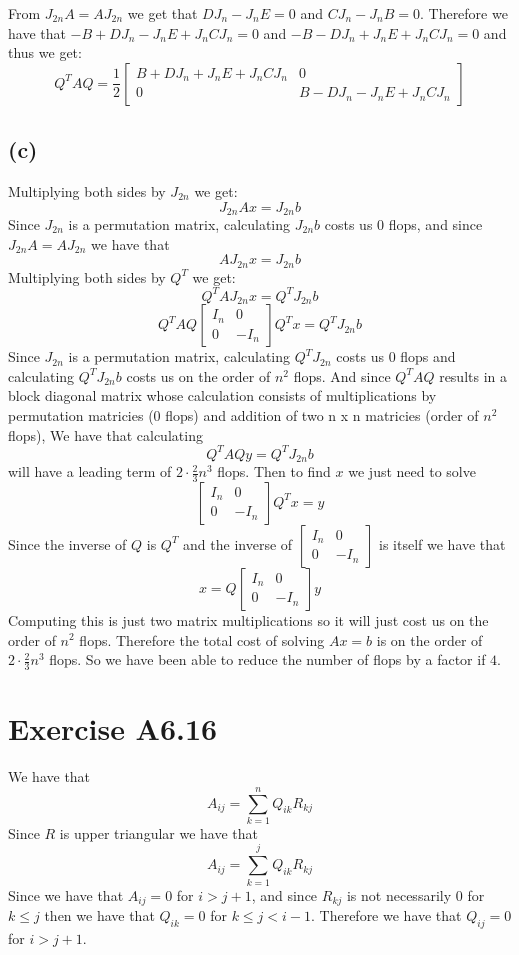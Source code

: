 From $J_{2n}A=AJ_{2n}$ we get that $DJ_n-J_nE=0$ and 
$CJ_n-J_nB=0$. Therefore we have that $-B+DJ_n-J_nE+J_nCJ_n=0$
and $-B-DJ_n+J_nE+J_nCJ_n=0$ and thus we get:
$$Q^TAQ=\frac{1}{2} \begin{bmatrix}
        B+DJ_n+J_nE+J_nCJ_n & 0\\
        0 & B-DJ_n-J_nE+J_nCJ_n
    \end{bmatrix}$$
\subsection*{(c)}
Multiplying both sides by $J_{2n}$ we get:
$$J_{2n}Ax=J_{2n}b$$
Since $J_{2n}$ is a permutation matrix, calculating $J_{2n}b$ costs us 
0 flops, and since $J_{2n}A=AJ_{2n}$ we have that 
$$AJ_{2n}x=J_{2n}b$$
Multiplying both sides by $Q^T$ we get:
$$Q^TAJ_{2n}x=Q^TJ_{2n}b$$
$$Q^TAQ\begin{bmatrix}
        I_n & 0\\
        0 & -I_n
    \end{bmatrix}Q^Tx=Q^TJ_{2n}b$$
Since $J_{2n}$ is a permutation matrix, calculating $Q^TJ_{2n}$ costs us 
0 flops and calculating $Q^TJ_{2n}b$ costs us on the order of $n^2$ flops.
And since $Q^TAQ$ results in a block diagonal matrix whose
calculation consists of multiplications by permutation matricies (0 flops)
and addition of two n x n matricies (order of $n^2$ flops),
We have that calculating 
$$Q^TAQy=Q^TJ_{2n}b$$
will have a leading term of $2\cdot\frac{2}{3}n^3$ flops. Then to find 
$x$ we just need to solve
$$\begin{bmatrix}
    I_n & 0\\
    0 & -I_n
\end{bmatrix}Q^Tx=y$$
Since the inverse of $Q$ is $Q^T$ and the inverse of $\begin{bmatrix}
    I_n & 0\\
    0 & -I_n
\end{bmatrix}$ is itself we have that
$$x=Q\begin{bmatrix}
    I_n & 0\\
    0 & -I_n
\end{bmatrix}y$$
Computing this is just two matrix multiplications 
so it will just cost us on the order of $n^2$ flops.
Therefore the total cost of solving $Ax=b$ is on the order of
$2\cdot\frac{2}{3}n^3$ flops. So
we have been able to reduce the number of flops by a factor if $4$.
\section*{Exercise A6.16}
We have that 
$$A_{ij}=\sum_{k=1}^n Q_{ik}R_{kj}$$
Since $R$ is upper triangular we have that 
$$A_{ij}=\sum_{k=1}^j Q_{ik}R_{kj}$$
Since we have that $A_{ij}=0$ for $i>j+1$, and since $R_{kj}$
is not necessarily $0$ for $k\leq j$ then we have that
$Q_{ik}=0$ for $k\leq j<i-1$. Therefore we have that
$Q_{ij}=0$ for $i>j+1$.  

